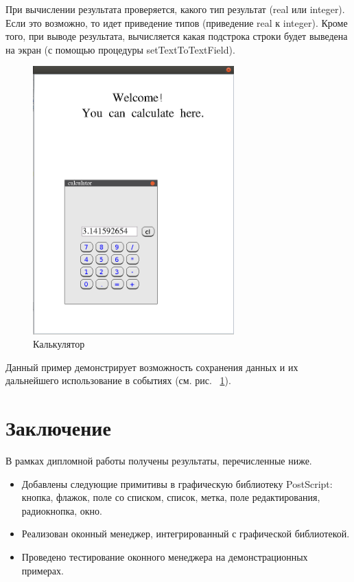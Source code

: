 \documentclass[14pt]{extarticle}
\begin{document}
	При вычислении результата проверяется, какого тип результат (real или integer). Если это возможно, то идет приведение типов (приведение real к integer). Кроме того, при выводе результата, вычисляется какая подстрока строки будет выведена на экран (с помощью процедуры setTextToTextField).
	
	
	\begin{figure}[h]
		\begin{center}
		\begin{minipage}[h]{0.4\linewidth}
		\includegraphics[width=220pt]{pictures/filledCalc.png}
		\caption{ Калькулятор} %
		\label{calculator} %
		\end{minipage}
		\end{center}
		\end{figure}
		
	Данный пример демонстрирует возможность сохранения данных и их дальнейшего использование в событиях (см. рис. ~\ref{calculator}).
	
	\pagebreak
	\section*{Заключение}
	
	В рамках дипломной работы получены результаты, перечисленные ниже.
	\begin{itemize}
		\item Добавлены следующие примитивы в графическую библиотеку  PostScript: кнопка, флажок, поле со списком, список, метка, поле редактирования, радиокнопка, окно.
		\item Реализован оконный менеджер, интегрированный с графической библиотекой.
		\item Проведено тестирование оконного менеджера на демонстрационных примерах.
	\end{itemize}
	
\end{document}
